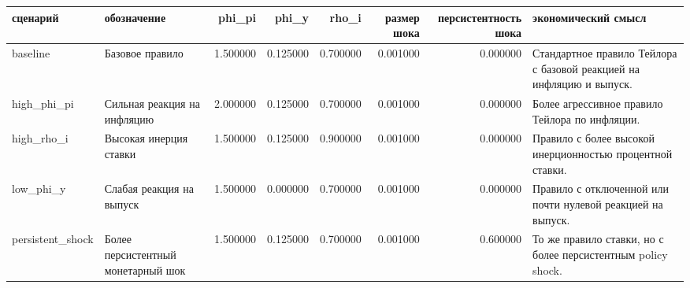 \begin{tabular}{llrrrrrl}
\toprule
сценарий & обозначение & phi_pi & phi_y & rho_i & размер шока & персистентность шока & экономический смысл \\
\midrule
baseline & Базовое правило & 1.500000 & 0.125000 & 0.700000 & 0.001000 & 0.000000 & Стандартное правило Тейлора с базовой реакцией на инфляцию и выпуск. \\
high_phi_pi & Сильная реакция на инфляцию & 2.000000 & 0.125000 & 0.700000 & 0.001000 & 0.000000 & Более агрессивное правило Тейлора по инфляции. \\
high_rho_i & Высокая инерция ставки & 1.500000 & 0.125000 & 0.900000 & 0.001000 & 0.000000 & Правило с более высокой инерционностью процентной ставки. \\
low_phi_y & Слабая реакция на выпуск & 1.500000 & 0.000000 & 0.700000 & 0.001000 & 0.000000 & Правило с отключенной или почти нулевой реакцией на выпуск. \\
persistent_shock & Более персистентный монетарный шок & 1.500000 & 0.125000 & 0.700000 & 0.001000 & 0.600000 & То же правило ставки, но с более персистентным policy shock. \\
\bottomrule
\end{tabular}
